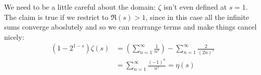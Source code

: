 \documentclass{homework}
\begin{document}
                                                                                                                                                                        \begin{solution}
                                                                                                                                                                        We need to be a little careful about the domain: $\zeta$ isn't even defined at $s=1$. The claim is true if we restrict to $\Re(s)>1$, since in this case all the infinite sums converge aboslutely and so we can rearrange terms and make things cancel nicely:
                                                                                                                                                                        \begin{align*}
                                                                                                                                                                        \left( 1 - 2^{1-s} \right)\zeta(s) &=    (\sum_{n=1}^\infty \frac{1}{n^s}) -  \sum_{n=1}^\infty \frac{2}{(2n)^s} \\
                                                                                                                                                                        &= \sum_{n=1}^\infty \frac{(-1)^n}{n^s} = \eta(s)
                                                                                                                                                                        \end{align*}
                                                                                                                                                                        \end{solution}
                                                                                                                                                                        
\end{document}
